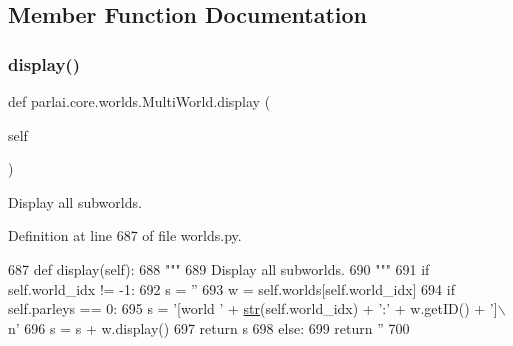 \subsection{Member Function Documentation}
\mbox{\label{classparlai_1_1core_1_1worlds_1_1MultiWorld_a03a162a9c53ed806221e46762d3fcb52}} 
\subsubsection{\texorpdfstring{display()}{display()}}
{\footnotesize\ttfamily def parlai.\+core.\+worlds.\+Multi\+World.\+display (\begin{DoxyParamCaption}\item[{}]{self }\end{DoxyParamCaption})}

\begin{DoxyVerb}Display all subworlds.
\end{DoxyVerb}
 

Definition at line 687 of file worlds.\+py.


\begin{DoxyCode}
687     \textcolor{keyword}{def }display(self):
688         \textcolor{stringliteral}{"""}
689 \textcolor{stringliteral}{        Display all subworlds.}
690 \textcolor{stringliteral}{        """}
691         \textcolor{keywordflow}{if} self.world\_idx != -1:
692             s = \textcolor{stringliteral}{''}
693             w = self.worlds[self.world\_idx]
694             \textcolor{keywordflow}{if} self.parleys == 0:
695                 s = \textcolor{stringliteral}{'[world '} + \hyperlink{namespacegenerate__task__READMEs_a5b88452ffb87b78c8c85ececebafc09f}{str}(self.world\_idx) + \textcolor{stringliteral}{':'} + w.getID() + \textcolor{stringliteral}{']\(\backslash\)n'}
696             s = s + w.display()
697             \textcolor{keywordflow}{return} s
698         \textcolor{keywordflow}{else}:
699             \textcolor{keywordflow}{return} \textcolor{stringliteral}{''}
700 
\end{DoxyCode}
\mbox{\label{classparlai_1_1core_1_1worlds_1_1MultiWorld_a7034326fa264402e0857a98d1ec688de}} 
